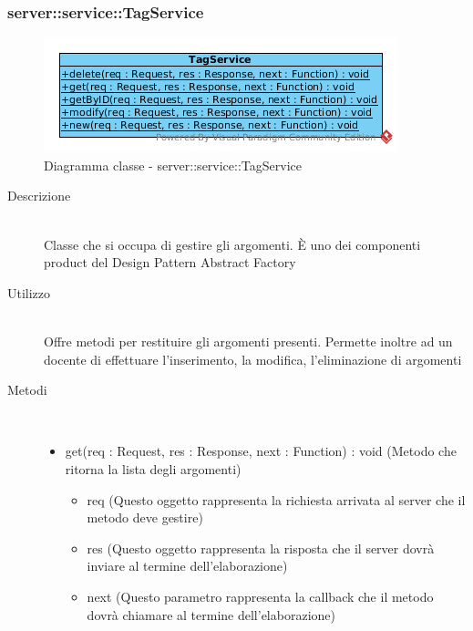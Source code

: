 \vspace{0.5cm}
\hypertarget{server::service::TagService}{}
\subsubsection[TagService]{server::service::TagService}
\begin{center}
			\begin{figure}[H]
				\centering \includegraphics[scale=4, max width=\textwidth, max height=\myheight]{../img/diagrammiClassi/server/service/TagService.png}
				\caption{Diagramma classe - server::service::TagService}
			\end{figure}
		\end{center}\begin{description}
\item[Descrizione] \hfill \\
 Classe che si occupa di gestire gli argomenti. È uno dei componenti product del Design Pattern Abstract Factory
\item[Utilizzo] \hfill \\
 Offre metodi per restituire gli argomenti presenti. Permette inoltre ad un docente di effettuare l'inserimento, la modifica, l'eliminazione di argomenti
\item[Metodi] \hfill \\
 \vspace{-7mm}
\begin{itemize}
\item get(req : Request, res : Response, next : Function) : void (Metodo che ritorna la lista degli argomenti)\begin{itemize}
\item req (Questo oggetto rappresenta la richiesta arrivata al server che il metodo deve gestire)
\item res (Questo oggetto rappresenta la risposta che il server dovrà inviare al termine dell'elaborazione)
\item next (Questo parametro rappresenta la callback che il metodo dovrà chiamare al termine dell’elaborazione)
\end{itemize}


\end{itemize}
\end{description}

